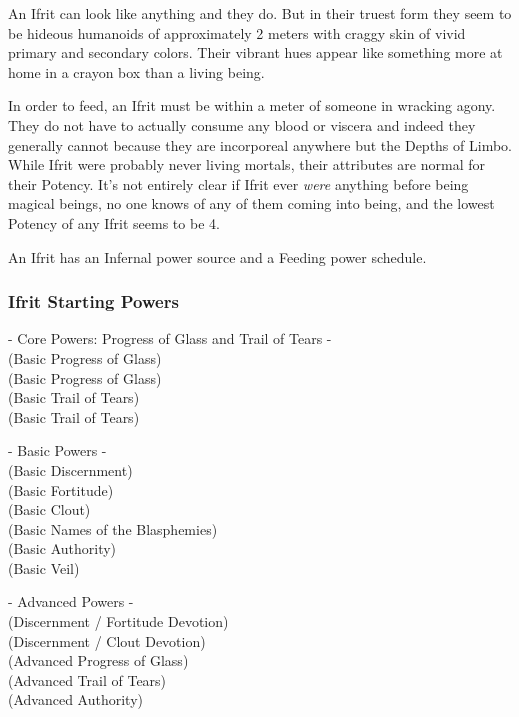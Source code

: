 An Ifrit can look like anything and they do. But in their truest form they seem to be hideous humanoids of approximately 2 meters with craggy skin of vivid primary and secondary colors. Their vibrant hues appear like something more at home in a crayon box than a living being.

In order to feed, an Ifrit must be within a meter of someone in wracking agony. They do not have to actually consume any blood or viscera and indeed they generally cannot because they are incorporeal anywhere but the Depths of Limbo. While Ifrit were probably never living mortals, their attributes are normal for their Potency.  It's not entirely clear if Ifrit ever \textit{were} anything before being magical beings, no one knows of any of them coming into being, and the lowest Potency of any Ifrit seems to be 4.

An Ifrit has an Infernal power source and a Feeding power schedule.

\subsubsection{Ifrit Starting Powers}

\hspace{\parindent} - Core Powers: Progress of Glass and Trail of Tears -\\
 (Basic Progress of Glass)\\
 (Basic Progress of Glass)\\
 (Basic Trail of Tears)\\
 (Basic Trail of Tears)

- Basic Powers -\\
 (Basic Discernment)\\
 (Basic Fortitude)\\
 (Basic Clout)\\
 (Basic Names of the Blasphemies)\\
 (Basic Authority)\\
 (Basic Veil)

- Advanced Powers -\\
 (Discernment / Fortitude Devotion)\\
 (Discernment / Clout Devotion)\\
 (Advanced Progress of Glass)\\
 (Advanced Trail of Tears)\\
 (Advanced Authority)

